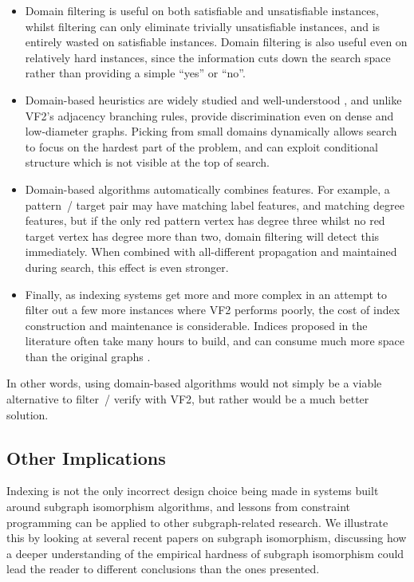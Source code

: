 \documentclass[twoside,11pt]{article}
\newcommand{\citep}[1]{\cite{#1}}
\begin{document}
\begin{itemize}
    \item Domain filtering is useful on both satisfiable and unsatisfiable instances, whilst
        filtering can only eliminate trivially unsatisfiable instances, and is entirely wasted on
        satisfiable instances. Domain filtering is also useful even on relatively hard instances,
        since the information cuts down the search space rather than providing a simple ``yes'' or
        ``no''.

    \item Domain-based heuristics are widely studied and well-understood
        \citep{DBLP:conf/ecai/SmithG98}, and unlike VF2's adjacency branching rules, provide
        discrimination even on dense and low-diameter graphs. Picking from small domains dynamically
        allows search to focus on the hardest part of the problem, and can exploit conditional
        structure which is not visible at the top of search.

    \item Domain-based algorithms automatically combines features. For example, a pattern~/ target
        pair may have matching label features, and matching degree features, but if the only red
        pattern vertex has degree three whilst no red target vertex has degree more than two, domain
        filtering will detect this immediately. When combined with all-different propagation and
        maintained during search, this effect is even stronger.

    \item Finally, as indexing systems get more and more complex in an attempt to filter out a few more
        instances where VF2 performs poorly, the cost of index construction and maintenance is
        considerable.  Indices proposed in the literature often take many hours to build, and can
        consume much more space than the original graphs \citep{DBLP:journals/tkde/HongZLY15}.
\end{itemize}

In other words, using domain-based algorithms would not simply be a viable alternative to filter~/
verify with VF2, but rather would be a much better solution.

\subsection{Other Implications}

Indexing is not the only incorrect design choice being made in systems built around
subgraph isomorphism algorithms, and lessons from constraint programming can be applied to other
subgraph-related research. We illustrate this by looking at several recent papers on subgraph
isomorphism, discussing how a deeper understanding of the empirical hardness of subgraph isomorphism
could lead the reader to different conclusions than the ones presented.
\end{document}
